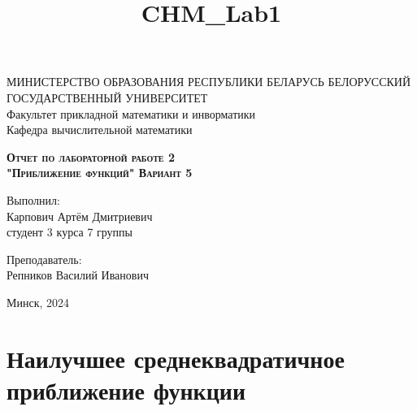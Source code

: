 \documentclass[11pt]{article}
\title{CHM\_Lab1}
\begin{document}
    
    \begin{titlepage}
    \newpage
    
    \begin{center}
    МИНИСТЕРСТВО ОБРАЗОВАНИЯ РЕСПУБЛИКИ БЕЛАРУСЬ БЕЛОРУССКИЙ ГОСУДАРСТВЕННЫЙ УНИВЕРСИТЕТ \\
    Факультет прикладной математики и инворматики \\ Кафедра вычислительной математики
 
    \end{center}
    
    \vspace{8em}
    
    \vspace{2em}
    
    \begin{center}
    \textsc{\textbf{Отчет по лабораторной работе 2 \\ "Приближение функций" \linebreak Вариант 5}}
    \end{center}
    
    \vspace{6em}
    
    \begin{flushright}
        Выполнил:\\
        Карпович Артём Дмитриевич\\
        студент 3 курса 7 группы
    \end{flushright}
    
    \begin{flushright}
        Преподаватель:\\
        Репников Василий Иванович
    \end{flushright}
    
    \vspace{\fill}
    
    \vspace{\fill}
    
    \begin{center}
    Минск, 2024
    \end{center}
    
    \end{titlepage}
    
    \section*{Наилучшее среднеквадратичное приближение
функции}\label{ux43dux430ux438ux43bux443ux447ux448ux435ux435-ux441ux440ux435ux434ux43dux435ux43aux432ux430ux434ux440ux430ux442ux438ux447ux43dux43eux435-ux43fux440ux438ux431ux43bux438ux436ux435ux43dux438ux435-ux444ux443ux43dux43aux446ux438ux438}
\end{document}
